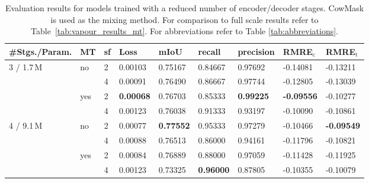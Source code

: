 \begin{table}[htbp]
    \centering
    \begin{tabular}{lllllllll}
        \toprule
        \#Stgs./Param. & MT  & sf & Loss             & mIoU             & recall           & precision        & RMRE$_\text{c}$   & RMRE$_\text{t}$   \\ \midrule
        3 / 1.7\,M       & no  & 2  & 0.00103          & 0.75167          & 0.84667          & 0.97692          & -0.14081          & -0.13211          \\
                 &     & 4  & 0.00091          & 0.76490          & 0.86667          & 0.97744          & -0.12805          & -0.13039          \\
                 & yes & 2  & \textbf{0.00068} & 0.76703          & 0.85333          & \textbf{0.99225} & \textbf{-0.09556} & -0.10277          \\
                 &     & 4  & 0.00123          & 0.76038          & 0.91333          & 0.93197          & -0.10090          & -0.10861          \\ \midrule
        4 / 9.1\,M        & no  & 2  & 0.00077          & \textbf{0.77552} & 0.95333          & 0.97279          & -0.10466          & \textbf{-0.09549} \\
                 &     & 4  & 0.00088          & 0.76513          & 0.86000          & 0.94161          & -0.11796          & -0.10821          \\
                 & yes & 2  & 0.00084          & 0.76889          & 0.88000          & 0.97059          & -0.11428          & -0.11925          \\
                 &     & 4  & 0.00123          & 0.73325          & \textbf{0.96000} & 0.87805          & -0.10355          & -0.10079          \\ \bottomrule
        \end{tabular}
        \vspace{0.2cm}
    \caption{Evaluation results for models trained with a reduced number of encoder/decoder stages. CowMask is used as the mixing method. For comparison to full scale results refer to Table~\ref{tab:vapour_results_mt}. For abbreviations refer to Table \ref{tab:abbreviations}.}
    \label{tab:results_reduced_layers}
\end{table}
